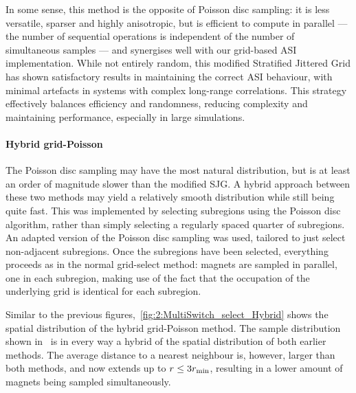 In some sense, this method is the opposite of Poisson disc sampling: it is less versatile, sparser and highly anisotropic, but is efficient to compute in parallel --- the number of sequential operations is independent of the number of simultaneous samples --- and synergises well with our grid-based ASI implementation.
While not entirely random, this modified Stratified Jittered Grid has shown satisfactory results in maintaining the correct ASI behaviour, with minimal artefacts in systems with complex long-range correlations.
This strategy effectively balances efficiency and randomness, reducing complexity and maintaining performance, especially in large simulations.

\paragraph{Hybrid grid-Poisson}
The Poisson disc sampling may have the most natural distribution, but is at least an order of magnitude slower than the modified SJG.
A hybrid approach between these two methods may yield a relatively smooth distribution while still being quite fast.
This was implemented by selecting subregions using the Poisson disc algorithm, rather than simply selecting a regularly spaced quarter of subregions.
An adapted version of the Poisson disc sampling was used, tailored to just select non-adjacent subregions.
Once the subregions have been selected, everything proceeds as in the normal grid-select method: magnets are sampled in parallel, one in each subregion, making use of the fact that the occupation of the underlying grid is identical for each subregion. \par
Similar to the previous figures,~\cref{fig:2:MultiSwitch_select_Hybrid} shows the spatial distribution of the hybrid grid-Poisson method.
The sample distribution shown in~ is in every way a hybrid of the spatial distribution of both earlier methods.
The average distance to a nearest neighbour is, however, larger than both methods, and now extends up to $r \leq 3 r_\mathrm{min}$, resulting in a lower amount of magnets being sampled simultaneously. \par


